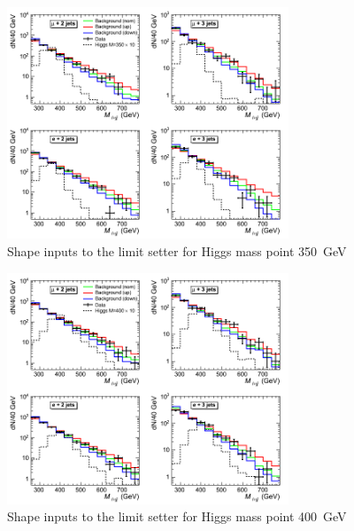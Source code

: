 \begin{figure}[h!]
\begin{center}
\includegraphics[width=0.75\textwidth]{plots/2012_SHAPES/hww-histo-shapes-M=350}
\caption{Shape inputs to the limit setter for Higgs mass point 350~GeV}
\end{center}
\end{figure}
\begin{figure}[h!]
\begin{center}
\includegraphics[width=0.75\textwidth]{plots/2012_SHAPES/hww-histo-shapes-M=400}
\caption{Shape inputs to the limit setter for Higgs mass point 400~GeV}
\end{center}
\end{figure}

\clearpage

